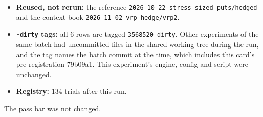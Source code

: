 \documentclass{article}
\begin{document}
\begin{itemize}

\item \textbf{Reused, not rerun:} the reference \texttt{2026-\allowbreak{}10-\allowbreak{}22-\allowbreak{}stress-\allowbreak{}sized-\allowbreak{}puts/\allowbreak{}hedged} and the context book \texttt{2026-\allowbreak{}11-\allowbreak{}02-\allowbreak{}vrp-\allowbreak{}hedge/\allowbreak{}vrp2}.

\item \textbf{\texttt{-\allowbreak{}dirty} tags:} all 6 rows are tagged \texttt{3568520-\allowbreak{}dirty}. Other experiments of the same batch had uncommitted files in the shared working tree during the run, and the tag names the batch commit at the time, which includes this card's pre-registration 79b09a1. This experiment's engine, config and script were unchanged.

\item \textbf{Registry:} 134 trials after this run.

\end{itemize}

The pass bar was not changed.
\end{document}
